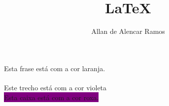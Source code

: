\documentclass[12pt, a4paper, oneside]{book}
\begin{document}
\title{LaTeX}
\author{Allan de Alencar Ramos} 
\maketitle

\pagecolor{blue}

\textcolor{laranja}{Esta frase está com a cor laranja.}\\

\color{Aqua}{Esta frase está com a cor aqua.}\\
\color{Violet} {Este trecho está com a cor violeta}\\

\colorbox{Purple}{Esta caixa está com a cor roxa.}
\end{document}
